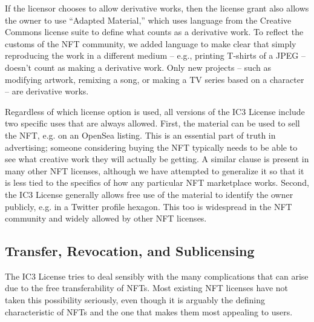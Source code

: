 \documentclass{article}
\begin{document}
If the licensor chooses to allow derivative works, then the license grant also allows the owner to use ``Adapted Material,'' which uses language from the Creative Commons license suite to define what counts as a derivative work. To reflect the customs of the NFT community, we added language to make clear that simply reproducing the work in a different medium -- e.g., printing T-shirts of a JPEG -- doesn't count as making a derivative work. Only new projects -- such as modifying artwork, remixing a song, or making a TV series based on a character -- are derivative works.

Regardless of which license option is used, all versions of the IC3 License include two specific uses that are always allowed. First, the material can be used to sell the NFT, e.g. on an OpenSea listing. This is an essential part of truth in advertising; someone considering buying the NFT typically needs to be able to see what creative work they will actually be getting. A similar clause is present in many other NFT licenses, although we have attempted to generalize it so that it is less tied to the specifics of how any particular NFT marketplace works. Second, the IC3 License generally allows free use of the material to identify the owner publicly, e.g. in a Twitter profile hexagon. This too is widespread in the NFT community and widely allowed by other NFT licenses.


\subsection{Transfer, Revocation, and Sublicensing}

The IC3 License tries to deal sensibly with the many complications that can arise due to the free transferability of NFTs. Most existing NFT licenses have not taken this possibility seriously, even though it is arguably the defining characteristic of NFTs and the one that makes them most appealing to users.
\end{document}
